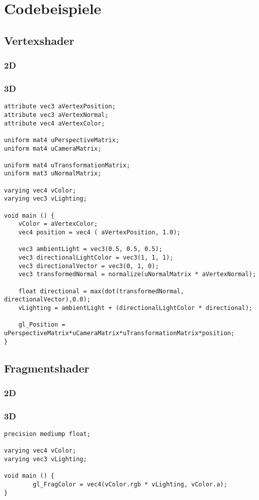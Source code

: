 \chapter{Codebeispiele}

\section{Vertexshader}
\subsection{2D}

\subsection{3D}
\begin{lstlisting}
attribute vec3 aVertexPosition;
attribute vec3 aVertexNormal;
attribute vec4 aVertexColor;

uniform mat4 uPerspectiveMatrix;
uniform mat4 uCameraMatrix;

uniform mat4 uTransformationMatrix;
uniform mat3 uNormalMatrix;

varying vec4 vColor;
varying vec3 vLighting;

void main () {
    vColor = aVertexColor;
    vec4 position = vec4 ( aVertexPosition, 1.0);

    vec3 ambientLight = vec3(0.5, 0.5, 0.5);
    vec3 directionalLightColor = vec3(1, 1, 1);
    vec3 directionalVector = vec3(0, 1, 0);
    vec3 transformedNormal = normalize(uNormalMatrix * aVertexNormal);
    
    float directional = max(dot(transformedNormal, directionalVector),0.0);
    vLighting = ambientLight + (directionalLightColor * directional);

    gl_Position = uPerspectiveMatrix*uCameraMatrix*uTransformationMatrix*position;
}
\end{lstlisting}

\section{Fragmentshader}
\subsection{2D}

\subsection{3D}
\begin{lstlisting}
precision mediump float;

varying vec4 vColor;
varying vec3 vLighting;

void main () {
        gl_FragColor = vec4(vColor.rgb * vLighting, vColor.a);
}
\end{lstlisting}


